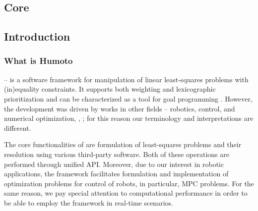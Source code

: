 \documentclass[12pt,a4paper]{book}
\title{\projectname}
\author{}
\date{\today}
\begin{document}
\begin{refsection}
\maketitle
\tableofcontents

\clearpage
{}
\printacronyms
{}


\part{Core}

\chapter{Introduction}


\section{What is Humoto}\label{sec.intro}

\projectname{} -- is a software framework for manipulation of linear
    least-squares problems with (in)equality constraints. It supports both
    weighting and lexicographic prioritization and can be characterized as a
    tool for goal programming \cite{wiki2017gp}. However, the development was
    driven by works in other fields -- robotics, control, and numerical
    optimization, \EG, \cite{Dimitrov2015preprint, Saab2012tranrob,
    Escande2014ijrr}; for this reason our terminology and interpretations are
    different.


The core functionalities of \projectname are formulation of least-squares
    problems and their resolution using various third-party software. Both of
    these operations are performed through unified \ac{API}. Moreover, due to
    our interest in robotic applications, the framework facilitates formulation
    and implementation of optimization problems for control of robots, in
    particular, \ac{MPC} problems. For the same reason, we pay special
    attention to computational performance in order to be able to employ the
    framework in real-time scenarios.



\end{refsection}
\end{document}
